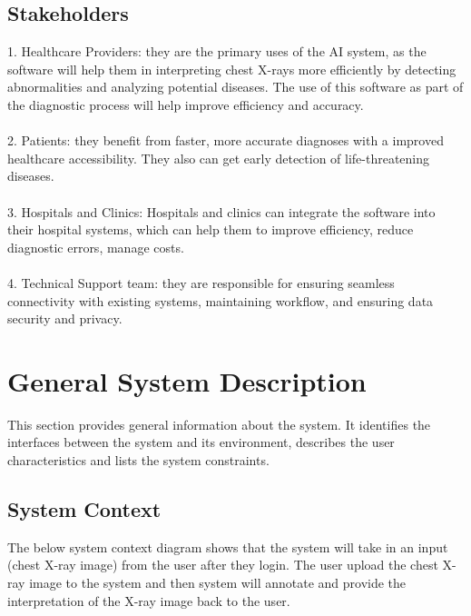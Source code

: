 \documentclass[12pt]{article}
\begin{document}
\subsection{Stakeholders}
1. Healthcare Providers: they are the primary uses of the AI system, as the software will help them in interpreting chest X-rays more efficiently by detecting abnormalities and analyzing potential diseases. The use of this software as part of the diagnostic process will help improve efficiency and accuracy.
\\
\\
2. Patients: they benefit from faster, more accurate diagnoses with a improved healthcare accessibility. They also can get early detection of life-threatening diseases.\\
\\
3. Hospitals and Clinics: Hospitals and clinics can integrate the software into their hospital systems, which can help them to improve efficiency, reduce diagnostic errors, manage costs.\\
\\
4. Technical Support team: they are responsible for ensuring seamless connectivity with existing systems, maintaining workflow, and ensuring data security and privacy. \\

\section{General System Description}

This section provides general information about the system.  It identifies the
interfaces between the system and its environment, describes the user
characteristics and lists the system constraints. \\

\subsection{System Context}

The below system context diagram shows that the system will take in an input (chest X-ray image) from the user after they login. The user upload the chest X-ray image to the system and then system will annotate and provide the interpretation of the X-ray image back to the user.
\end{document}
